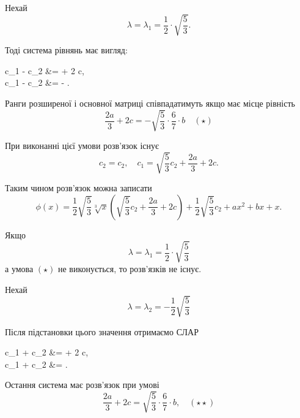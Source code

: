 \begin{solution}
	Нехай 
	\begin{equation*}
		\lambda = \lambda_1 = \frac{1}{2} \cdot \sqrt{\frac{5}{3}}.
	\end{equation*}
	
	Тоді система рівнянь має вигляд:
	\begin{system*}
		c_1 -  c_2 &=  + 2 c, \\
		c_1 -  c_2 &= -  .
	\end{system*}

	Ранги розширеної і основної матриці співпадатимуть якщо має місце рівність
	\begin{equation*}
		\frac{2a}{3} + 2c = -\sqrt{\frac{5}{3}} \cdot \frac{6}{7} \cdot b \quad (\star)
	\end{equation*}

	При виконанні цієї умови розв'язок існує
	\begin{equation*}
		c_2 = c_2, \quad c_1 = \sqrt{\frac{5}{3}} c_2 + \frac{2a}{3} + 2c.
	\end{equation*}

	Таким чином розв'язок можна записати
	\begin{equation*}
		\phi(x) = \dfrac{1}{2} \sqrt{\dfrac{5}{3}} \sqrt[3]{x} \left( \sqrt{\dfrac{5}{3}} c_2 + \dfrac{2a}{3} + 2c \right) + \dfrac{1}{2} \sqrt{\dfrac{5}{3}} c_2 + ax^2 + bx + x.
	\end{equation*}

	Якщо
	\begin{equation*}
		\lambda = \lambda_1 = \frac{1}{2} \cdot \sqrt{\frac{5}{3}}
	\end{equation*}
	а умова $(\star)$ не виконується, то розв'язків не існує. \medskip

	Нехай
	\begin{equation*}
		\lambda = \lambda_2 = - \frac{1}{2} \sqrt{\frac{5}{3}}
	\end{equation*}

	Після підстановки цього значення отримаємо СЛАР
	\begin{system*}
		c_1 +  c_2 &=  + 2 c, \\
		c_1 +  c_2 &=  \dfrac{6b}{7}.
	\end{system*}

	Остання система має розв'язок при умові
	\begin{equation*}
		\frac{2a}{3} + 2c = \sqrt{\frac{5}{3}} \cdot \frac{6}{7} \cdot b, \quad (\star\star)
	\end{equation*}


\end{solution}
